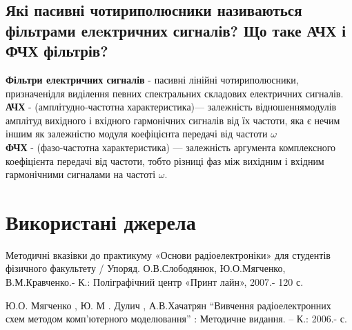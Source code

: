 \subsection{Які пасивні чотириполюсники називаються фільтрами елeктричних сигналів? Що таке АЧХ і ФЧХ фільтрів?}
\textbf{Фільтри електричних сигналів} - пасивні лінійні чотириполюсники, призначенідля виділення певних спектральних складових електричних сигналів. \\
\textbf{АЧХ} - (амплітудно-частотна характеристика)— залежність відношеннямодулів амплітуд вихідного і вхідного гармонічних сигналів від їх частоти, яка є нечим іншим як залежністю модуля коефіцієнта передачі від частоти $\omega$ \\
\textbf{ФЧХ} - (фазо-частотна характеристика) — залежність аргумента комплексного коефіцієнта передачі від частоти, тобто різниці фаз між вихідним і вхідним гармонічними сигналами на частоті $\omega$.

\section{Використані джерела}

\qquad Методичні вказівки до практикуму «Основи радіоелектроніки»
для студентів фізичного факультету / Упоряд. О.В.Слободянюк,
Ю.О.Мягченко, В.М.Кравченко.- К.: Поліграфічний центр «Принт
лайн», 2007.- 120 с.

\qquad Ю.О. Мягченко , Ю. М . Дулич , А.В.Хачатрян “Вивчення
радіоелектронних схем методом комп’ютерного моделювання” :
Методичне видання. – К.: 2006.- с.
